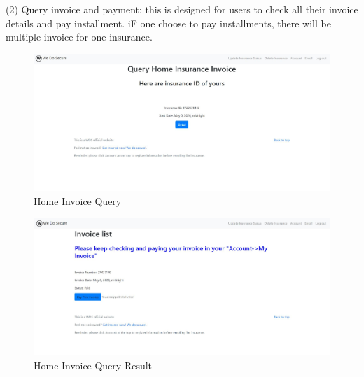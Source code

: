\documentclass[12pt]{article}
\begin{document}
    \noindent (2) Query invoice and payment: this is designed for users to check all their invoice details and pay installment. iF one choose to pay installments, there will be multiple invoice for one insurance.\\
	\begin{figure}[H]
		\centering
		\includegraphics[scale=0.38]{homeinvoicequery}
		\caption{Home Invoice Query}
	\end{figure}
	\begin{figure}[H]
		\centering
		\includegraphics[scale=0.38]{homeinvoicequeryresult}
		\caption{Home Invoice Query Result}
	\end{figure}

	
\end{document}
